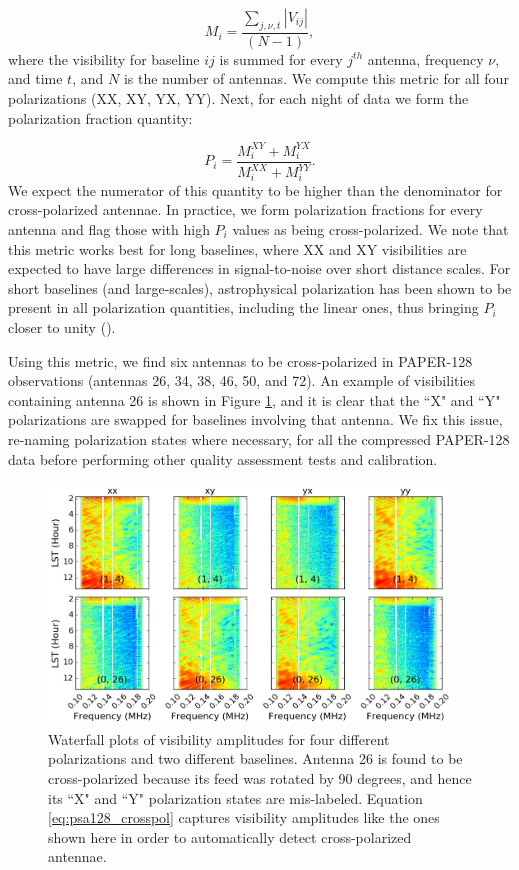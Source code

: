 \begin{equation}
\label{eq:psa128_badant}
M_{i} = \frac{\sum\limits_{j,\nu,t} |V_{ij}|}{(N-1)},
\end{equation}
where the visibility for baseline $ij$ is summed for every $j^{th}$ antenna, frequency $\nu$, and time $t$, and $N$ is the number of antennas. We compute this metric for all four polarizations (XX, XY, YX, YY). Next, for each night of data we form the polarization fraction quantity:

\begin{equation}
\label{eq:psa128_crosspol}
P_{i} = \frac{M_{i}^{XY} + M_{i}^{YX}}{M_{i}^{XX} + M_{i}^{YY}}.
\end{equation}
We expect the numerator of this quantity to be higher than the denominator for cross-polarized antennae. In practice, we form polarization fractions for every antenna and flag those with high $P_{i}$ values as being cross-polarized. We note that this metric works best for long baselines, where XX and XY visibilities are expected to have large differences in signal-to-noise over short distance scales. For short baselines (and large-scales), astrophysical polarization has been shown to be present in all polarization quantities, including the linear ones, thus bringing $P_{i}$ closer to unity (\citealt{lenc_et_al2016}).

Using this metric, we find six antennas to be cross-polarized in PAPER-128 observations (antennas 26, 34, 38, 46, 50, and 72). An example of visibilities containing antenna 26 is shown in Figure \ref{fig:psa128_crosspol}, and it is clear that the ``X" and ``Y" polarizations are swapped for baselines involving that antenna. We fix this issue, re-naming polarization states where necessary, for all the compressed PAPER-128 data before performing other quality assessment tests and calibration.

\begin{figure}
	\centering
	\includegraphics[width=0.96\textwidth]{plots/psa128_crosspol.png}
	\caption{Waterfall plots of visibility amplitudes for four different polarizations and two different baselines. Antenna 26 is found to be cross-polarized because its feed was rotated by 90 degrees, and hence its ``X" and ``Y" polarization states are mis-labeled. Equation \eqref{eq:psa128_crosspol} captures visibility amplitudes like the ones shown here in order to automatically detect cross-polarized antennae.}
	\label{fig:psa128_crosspol}
\end{figure}

